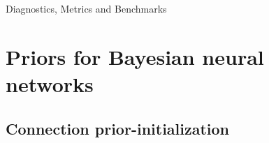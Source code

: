 \documentclass[9pt,handout]{beamer}
\begin{document}
\begin{frame}{Diagnostics, Metrics and Benchmarks}
\begin{itemize}[<+->]
%
\end{itemize}
\end{frame}


%
%


\section{Priors for Bayesian neural networks}

\subsection{Connection prior-initialization}
\end{document}
